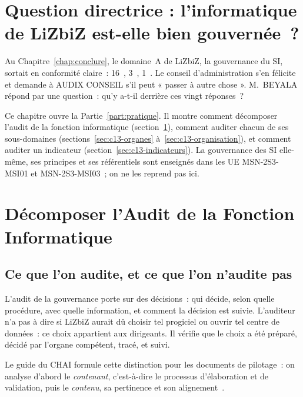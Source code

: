 \bigskip

\section*{Question directrice : l'informatique de LiZbiZ est-elle bien gouvernée~?}

Au Chapitre~\ref{chap:conclure}, le domaine~A de LiZbiZ, la gouvernance du
SI, sortait en conformité claire~: 16~\OUI{}, 3~\NON{}, 1~\NEK{}. Le conseil
d'administration s'en félicite et demande à AUDIX CONSEIL s'il peut
« passer à autre chose ». M.~BEYALA répond par une question~: qu'y a-t-il
derrière ces vingt réponses~?

Ce chapitre ouvre la Partie~\ref{part:pratique}. Il montre comment
décomposer l'audit de la fonction informatique
(section~\ref{sec:c13-decomposer}), comment auditer chacun de ses
sous-domaines (sections~\ref{sec:c13-organes} à~\ref{sec:c13-organisation}),
et comment auditer un indicateur (section~\ref{sec:c13-indicateurs}). La
gouvernance des SI elle-même, ses principes et ses référentiels sont
enseignés dans les UE MSN-2S3-MSI01 et MSN-2S3-MSI03~; on ne les reprend
pas ici.

\separateur

\section{Décomposer l'Audit de la Fonction Informatique}
\label{sec:c13-decomposer}

\subsection{Ce que l'on audite, et ce que l'on n'audite pas}

L'audit de la gouvernance porte sur des décisions~: qui décide, selon
quelle procédure, avec quelle information, et comment la décision est
suivie. L'auditeur n'a pas à dire si LiZbiZ aurait dû choisir tel
progiciel ou ouvrir tel centre de données~: ce choix appartient aux
dirigeants. Il vérifie que le choix a été préparé, décidé par l'organe
compétent, tracé, et suivi.

Le guide du CHAI formule cette distinction pour les documents de
pilotage~: on analyse d'abord le \emph{contenant}, c'est-à-dire le
processus d'élaboration et de validation, puis le \emph{contenu}, sa
pertinence et son alignement~\cite{chai2014guide}.

